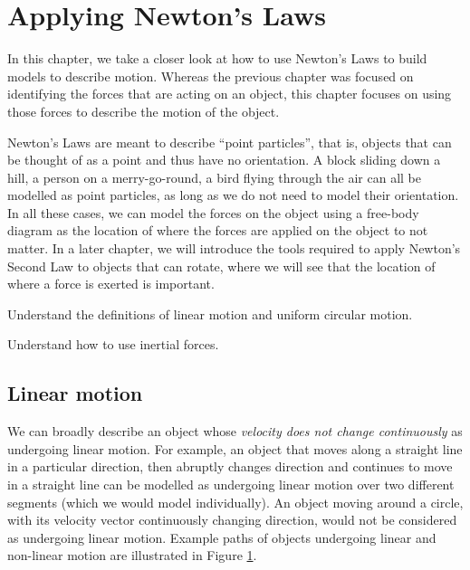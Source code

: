 
\chapter{Applying Newton's Laws}
\label{chap:ApplyingNewtonsLaws}
In this chapter, we take a closer look at how to use Newton's Laws to build models to describe motion. Whereas the previous chapter was focused on identifying the forces that are acting on an object, this chapter focuses on using those forces to describe the motion of the object.

Newton's Laws are meant to describe ``point particles'', that is, objects that can be thought of as a point and thus have no orientation. A block sliding down a hill, a person on a merry-go-round, a bird flying through the air can all be modelled as point particles, as long as we do not need to model their orientation. In all these cases, we can model the forces on the object using a free-body diagram as the location of where the forces are applied on the object to not matter. In a later chapter, we will introduce the tools required to apply Newton's Second Law to objects that can rotate, where we will see that the location of where a force is exerted is important.

\vspace{1cm}
\begin{learningObjectives}
\item Understand the definitions of linear motion and uniform circular motion.
\item Understand how to use inertial forces.
\end{learningObjectives}


\section{Linear motion}
We can broadly describe an object whose \textit{velocity does not change continuously} as undergoing linear motion. For example, an object that moves along a straight line in a particular direction, then abruptly changes direction and continues to move in a straight line can be modelled as undergoing linear motion over two different segments (which we would model individually). An object moving around a circle, with its velocity vector continuously changing direction, would not be considered as undergoing linear motion. Example paths of objects undergoing linear and non-linear motion are illustrated in Figure \ref{chap:ApplyingNewtonsLaws}.

